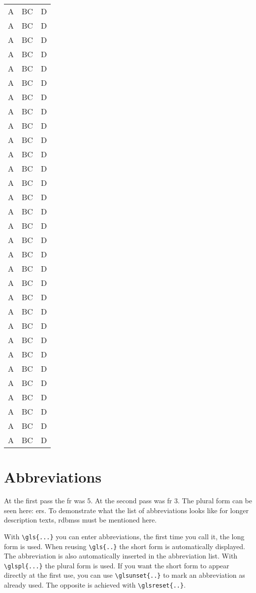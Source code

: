 \begin{longtable}{|l|l|l|}
A & BC & D \\
A & BC & D \\
A & BC & D \\
A & BC & D \\
A & BC & D \\
A & BC & D \\
A & BC & D \\
A & BC & D \\
A & BC & D \\
A & BC & D \\
A & BC & D \\
A & BC & D \\
A & BC & D \\
A & BC & D \\
A & BC & D \\
A & BC & D \\
A & BC & D \\
A & BC & D \\
A & BC & D \\
A & BC & D \\
A & BC & D \\
A & BC & D \\
A & BC & D \\
A & BC & D \\
A & BC & D \\
A & BC & D \\
A & BC & D \\
A & BC & D \\
A & BC & D \\
A & BC & D \\
A & BC & D \\
\end{longtable}


\section{Abbreviations}
At the first pass the \gls{fr} was 5.
At the second pass was \gls{fr} 3.
The plural form can be seen here: \glspl{er}.
To demonstrate what the list of abbreviations looks like for longer description texts, \glspl{rdbms} must be mentioned here.

With \verb+\gls{...}+ you can enter abbreviations, the first time you call it, the long form is used.
When reusing \verb+\gls{..}+ the short form is automatically displayed.
The abbreviation is also automatically inserted in the abbreviation list.
With \verb+\glspl{...}+ the plural form is used.
If you want the short form to appear directly at the first use, you can use \verb+\glsunset{..}+ to mark an abbreviation as already used.
The opposite is achieved with \verb+\glsreset{..}+.

